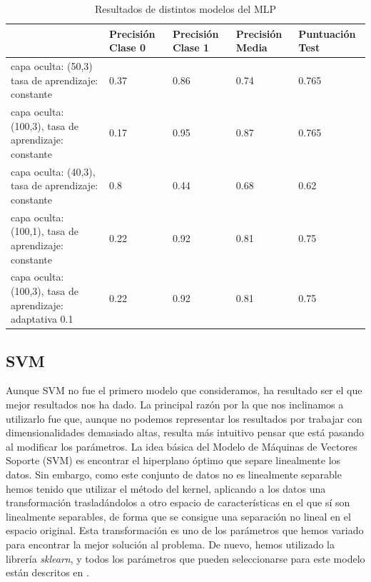\documentclass[journal,twoside]{JoPhA}
\begin{document}
\begin{table}[htb!]
	\begin{center}
		\caption{Resultados de distintos modelos del MLP}
		\begin{tabular}{| p{2.1cm} | p{1cm} | p{1cm} | p{1cm} | p{1.2cm} |}
			\hline
			& Precisión Clase 0 & Precisión Clase 1 & Precisión Media & Puntuación Test   \\ \hline
			capa oculta: (50,3) tasa de aprendizaje: constante & 0.37                & 0.86                & 0.74              & 0.765  \\ \hline
			capa oculta: (100,3), tasa de aprendizaje: constante & 0.17                & 0.95               & 0.87             & 0.765  \\ \hline
			capa oculta: (40,3), tasa de aprendizaje: constante & 0.8 & 0.44 & 0.68 & 0.62 \\ \hline
			capa oculta: (100,1), tasa de aprendizaje: constante & 0.22 & 0.92 & 0.81 & 0.75	\\ \hline
			capa oculta: (100,3), tasa de aprendizaje: adaptativa 0.1 & 0.22 & 0.92 & 0.81 & 0.75 \\ \hline
			
		\end{tabular}
		
		\label{tabla:tabla_mlp}
	\end{center}
\end{table}


\subsection{SVM}
	
	Aunque SVM no fue el primero modelo que consideramos, ha resultado ser el que mejor resultados nos ha dado. La principal razón por la que nos inclinamos a utilizarlo fue que, aunque no podemos representar los resultados por trabajar con dimensionalidades demasiado altas, resulta más intuitivo pensar que está pasando al modificar los parámetros. La idea básica del Modelo de Máquinas de Vectores Soporte (SVM) es encontrar el hiperplano óptimo que separe linealmente los datos. Sin embargo, como este conjunto de datos no es linealmente separable hemos tenido que utilizar el método del kernel, aplicando a los datos una transformación trasladándolos a otro espacio de características en el que sí son linealmente separables, de forma que se consigue una separación no lineal en el espacio original. Esta transformación es uno de los parámetros que hemos variado para encontrar la mejor solución al problema. De nuevo, hemos utilizado la librería \textit{sklearn}, y todos los parámetros que pueden seleccionarse para este modelo están descritos en \cite{svm}. \\
	
\end{document}
